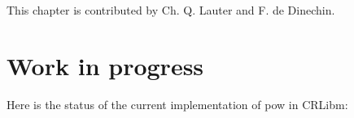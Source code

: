 %
%
%
%


This chapter is contributed by Ch. Q. Lauter and F. de Dinechin.




\section{Work in progress}

Here is the status of the current implementation of pow in CRLibm:


